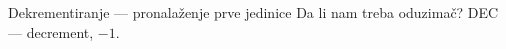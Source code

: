 
\begin{frame}[label=05-s035]{Dekrementiranje — pronalaženje prve jedinice}
\fontsize{10}{12}\selectfont\setlength{\tabcolsep}{4pt}
Da li nam treba oduzimač? DEC — decrement, $-1$.
\begin{center}\def\DEbroj{35}\def\DEpitanje{Najniža pozicija jedinice?}\end{center}
\end{frame}
